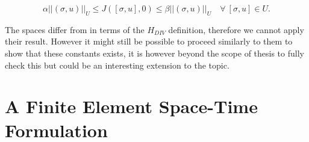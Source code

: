 \documentclass[../draft_1.tex]{subfiles}
\begin{document}
\begin{ceqn}
	\begin{equation}
	\alpha ||(\sigma, u)||_U \leq J([\sigma, u], 0) \leq \beta ||(\sigma, u)||_U  \quad \forall \  [\sigma, u] \in U.
	\end{equation}
\end{ceqn}

The spaces differ from \cite{cai1994first} in terms of the $H_{DIV}$ definition, therefore we cannot apply their result. However it might still be possible to proceed similarly to them to show that these constants exists, it is however beyond the scope of thesis to fully check this but could be an interesting extension to the topic.

\section{A Finite Element Space-Time Formulation}
\end{document}
